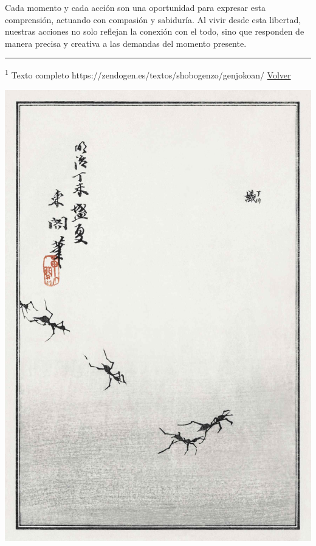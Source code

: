 \documentclass[
  a5paperpaper,
]{article}
\begin{document}
Cada momento y cada acción son una oportunidad para expresar esta
comprensión, actuando con compasión y sabiduría. Al vivir desde esta
libertad, nuestras acciones no solo reflejan la conexión con el todo,
sino que responden de manera precisa y creativa a las demandas del
momento presente.

\hfill\break

\begin{center}\rule{0.5\linewidth}{0.5pt}\end{center}

\leavevmode{}%
\textsuperscript{1} Texto completo
https://zendogen.es/textos/shobogenzo/genjokoan/
\protect\hyperlink{ref1}{Volver}

\hfill\break

\hypertarget{01}{}
\includegraphics{../img/image15.jpg}
\end{document}
